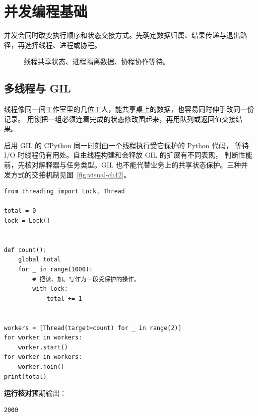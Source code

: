 \chapter{并发编程基础}
\label{ch:12-outline}

并发会同时改变执行顺序和状态交接方式。先确定数据归属、结果传递与退出路径，再选择线程、进程或协程。


\begin{figure}[htbp]
  \centering
  \caption*{线程共享状态、进程隔离数据、协程协作等待。}
\end{figure}


\section{多线程与 GIL}

线程像同一间工作室里的几位工人，能共享桌上的数据，也容易同时伸手改同一份记录。
用锁把一组必须连着完成的状态修改围起来，再用队列或返回值交接结果。

启用 GIL 的 CPython 同一时刻由一个线程执行受它保护的 Python 代码，
等待 I/O 时线程仍有用处。自由线程构建和会释放 GIL 的扩展有不同表现，
判断性能前，先核对解释器与任务类型。GIL 也不能代替业务上的共享状态保护。三种并发方式的交接机制见图~\ref{fig:visual-ch12}。


\begin{lstlisting}[title={\code{locked_count.py}}]
from threading import Lock, Thread

total = 0
lock = Lock()


def count():
    global total
    for _ in range(1000):
        # 把读、加、写作为一段受保护的操作。
        with lock:
            total += 1


workers = [Thread(target=count) for _ in range(2)]
for worker in workers:
    worker.start()
for worker in workers:
    worker.join()
print(total)
\end{lstlisting}


\textbf{运行核对}\enspace 预期输出：
\begin{lstlisting}[language={},numbers=none]
2000
\end{lstlisting}

